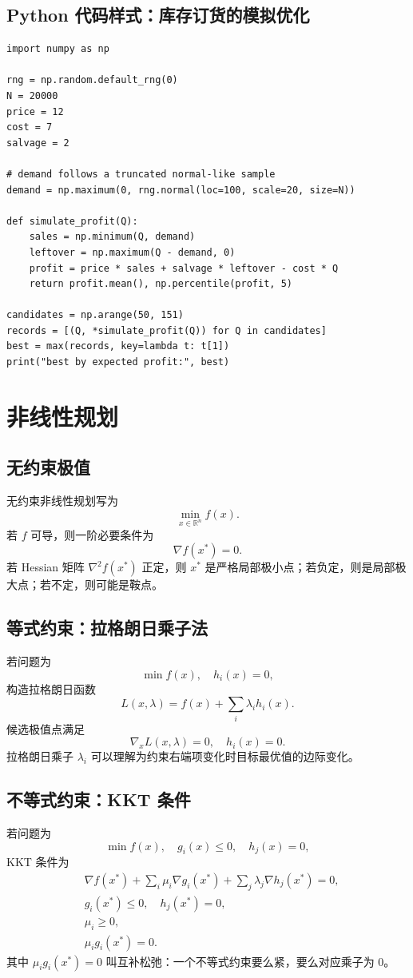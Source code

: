 \documentclass[11pt,a4paper]{ctexart}
\newcommand{\R}{\mathbb{R}}
\begin{document}
\subsection{Python 代码样式：库存订货的模拟优化}
\begin{lstlisting}
import numpy as np

rng = np.random.default_rng(0)
N = 20000
price = 12
cost = 7
salvage = 2

# demand follows a truncated normal-like sample
demand = np.maximum(0, rng.normal(loc=100, scale=20, size=N))

def simulate_profit(Q):
    sales = np.minimum(Q, demand)
    leftover = np.maximum(Q - demand, 0)
    profit = price * sales + salvage * leftover - cost * Q
    return profit.mean(), np.percentile(profit, 5)

candidates = np.arange(50, 151)
records = [(Q, *simulate_profit(Q)) for Q in candidates]
best = max(records, key=lambda t: t[1])
print("best by expected profit:", best)
\end{lstlisting}

\section{非线性规划}

\subsection{无约束极值}
无约束非线性规划写为
\[
\min_{x\in\R^n} f(x).
\]
若 $f$ 可导，则一阶必要条件为
\[
\nabla f(x^*)=0.
\]
若 Hessian 矩阵 $\nabla^2 f(x^*)$ 正定，则 $x^*$ 是严格局部极小点；若负定，则是局部极大点；若不定，则可能是鞍点。

\subsection{等式约束：拉格朗日乘子法}
若问题为
\[
\min f(x),\quad h_i(x)=0,
\]
构造拉格朗日函数
\[
L(x,\lambda)=f(x)+\sum_i\lambda_i h_i(x).
\]
候选极值点满足
\[
\nabla_x L(x,\lambda)=0,\quad h_i(x)=0.
\]
拉格朗日乘子 $\lambda_i$ 可以理解为约束右端项变化时目标最优值的边际变化。

\subsection{不等式约束：KKT 条件}
若问题为
\[
\min f(x),\quad g_i(x)\le0,\quad h_j(x)=0,
\]
KKT 条件为
\begin{align}
&\nabla f(x^*)+\sum_i\mu_i\nabla g_i(x^*)+\sum_j\lambda_j\nabla h_j(x^*)=0,\\
&g_i(x^*)\le0,
\quad h_j(x^*)=0,\\
&\mu_i\ge0,\\
&\mu_i g_i(x^*)=0.
\end{align}
其中 $\mu_i g_i(x^*)=0$ 叫互补松弛：一个不等式约束要么紧，要么对应乘子为 0。
\end{document}
